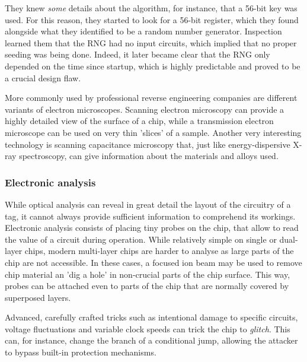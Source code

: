 \documentclass{llncs}
\begin{document}
They knew \emph{some} details about the algorithm, for instance, that a 56-bit key was used. For this reason, they started to look for a 56-bit register, which they found alongside what they identified to be a random number generator. Inspection learned them that the RNG had no input circuits, which implied that no proper seeding was being done. Indeed, it later became clear that the RNG only depended on the time since startup, which is highly predictable and proved to be a crucial design flaw. 

More commonly used by professional reverse engineering companies are different variants of electron microscopes. Scanning electron microscopy can provide a highly detailed view of the surface of a chip, while a transmission electron microscope can be used on very thin 'slices' of a sample. Another very interesting technology is scanning capacitance microscopy that, just like energy-dispersive X-ray spectroscopy, can give information about the materials and alloys used. 


\subsubsection{Electronic analysis}
While optical analysis can reveal in great detail the layout of the circuitry of a tag, it cannot always provide sufficient information to comprehend its workings. Electronic analysis consists of placing tiny probes on the chip, that allow to read the value of a circuit during operation. While relatively simple on single or dual-layer chips, modern multi-layer chips are harder to analyse as large parts of the chip are not accessible. In these cases, a focused ion beam may be used to remove chip material an 'dig a hole' in non-crucial parts of the chip surface. This way, probes can be attached even to parts of the chip that are normally covered by superposed layers. 

Advanced, carefully crafted tricks such as intentional damage to specific circuits, voltage fluctuations and variable clock speeds can trick the chip to \emph{glitch}. This can, for instance, change the branch of a conditional jump, allowing the attacker to bypass built-in protection mechanisms. 
\end{document}
